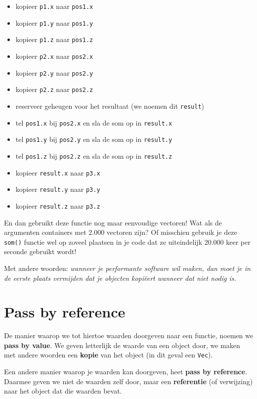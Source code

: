 \begin{itemize}
\item kopieer \texttt{p1.x} naar \texttt{pos1.x}
\item kopieer \texttt{p1.y} naar \texttt{pos1.y}
\item kopieer \texttt{p1.z} naar \texttt{pos1.z}
\item kopieer \texttt{p2.x} naar \texttt{pos2.x}
\item kopieer \texttt{p2.y} naar \texttt{pos2.y}
\item kopieer \texttt{p2.z} naar \texttt{pos2.z}
\item reserveer geheugen voor het resultaat (we noemen dit \texttt{result})
\item tel \texttt{pos1.x} bij \texttt{pos2.x} en sla de som op in \texttt{result.x}
\item tel \texttt{pos1.y} bij \texttt{pos2.y} en sla de som op in \texttt{result.y}
\item tel \texttt{pos1.z} bij \texttt{pos2.z} en sla de som op in \texttt{result.z}
\item kopieer \texttt{result.x} naar \texttt{p3.x}
\item kopieer \texttt{result.y} naar \texttt{p3.y}
\item kopieer \texttt{result.z} naar \texttt{p3.z}
\end{itemize}

En dan gebruikt deze functie nog maar eenvoudige vectoren! Wat als de argumenten containers met 2.000 vectoren zijn? Of misschien gebruik je deze \texttt{som()} functie wel op zoveel plaatsen in je code dat ze uiteindelijk 20.000 keer per seconde gebruikt wordt!

Met andere woorden: \emph{wanneer je performante software wil maken, dan moet je in de eerste plaats vermijden dat je objecten kopi\"{e}ert wanneer dat niet nodig is.}

\section{Pass by reference}
De manier waarop we tot hiertoe waarden doorgeven naar een functie, noemen we \textbf{pass by value}. We geven letterlijk de waarde van een object door, we maken met andere woorden een \textbf{kopie} van het object (in dit geval een \texttt{Vec}).

Een andere manier waarop je waarden kan doorgeven, heet \textbf{pass by reference}. Daarmee geven we niet de waarden zelf door, maar een \textbf{referentie} (of verwijzing) naar het object dat die waarden bevat.

